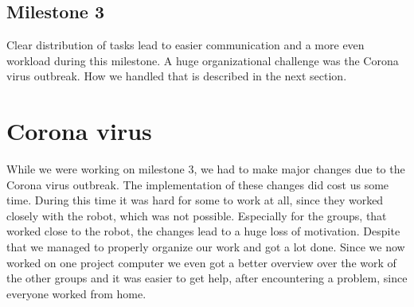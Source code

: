 \documentclass[main.tex]{subfiles}
\begin{document}
		\subsection{Milestone 3}
		Clear distribution of tasks lead to easier communication and a more even workload during this milestone.
		A huge organizational challenge was the Corona virus outbreak. How we handled that is described in the next section. 
		
		\section{Corona virus}
	  	While we were working on milestone 3, we had to make major changes due to the Corona virus outbreak. The implementation of these changes did cost us some time. During this time it was hard for some to work at all, since they worked closely with the robot, which was not possible.
	  	Especially for the groups, that worked close to the robot, the changes lead to a huge loss of motivation.
	  	Despite that we managed to properly organize our work and got a lot done.
	  	Since we now worked on one project computer we even got a better overview over the work of the other groups and it was easier to get help, after encountering a problem, since everyone worked from home.

	\endgroup
\end{document}
